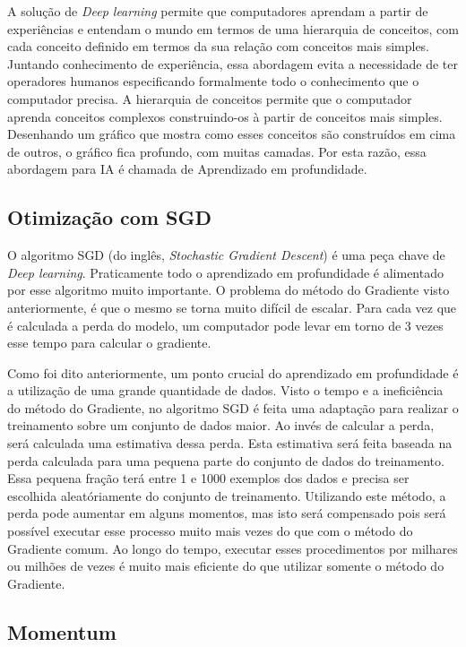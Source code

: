 A solução de \textit{Deep learning} permite que computadores aprendam
a partir de experiências e entendam o mundo em termos de uma
hierarquia de conceitos, com cada conceito definido em termos da sua
relação com conceitos mais simples. Juntando conhecimento de
experiência, essa abordagem evita a necessidade de ter operadores
humanos especificando formalmente todo o conhecimento que o computador
precisa. A hierarquia de conceitos permite que o computador aprenda
conceitos complexos construindo-os à partir de conceitos mais
simples. Desenhando um gráfico que mostra como esses conceitos são
construídos em cima de outros, o gráfico fica profundo, com muitas
camadas. Por esta razão, essa abordagem para IA é chamada de
Aprendizado em profundidade\cite{Goodfellow-et-al-2016-Book}.

\subsection{Otimização com SGD}

O algoritmo SGD (do inglês, \textit{Stochastic Gradient Descent}) é
uma peça chave de \textit{Deep learning}. Praticamente todo o
aprendizado em profundidade é alimentado por esse algoritmo muito
importante. O problema do método do Gradiente visto anteriormente, é
que o mesmo se torna muito difícil de escalar. Para cada vez que é
calculada a perda do modelo, um computador pode levar em torno de 3
vezes esse tempo para calcular o gradiente.

Como foi dito anteriormente, um ponto crucial do aprendizado em
profundidade é a utilização de uma grande quantidade de dados. Visto o
tempo e a ineficiência do método do Gradiente, no algoritmo SGD é
feita uma adaptação para realizar o treinamento sobre um conjunto de
dados maior. Ao invés de calcular a perda, será calculada uma
estimativa dessa perda. Esta estimativa será feita baseada na perda
calculada para uma pequena parte do conjunto de dados do
treinamento. Essa pequena fração terá entre 1 e 1000 exemplos dos
dados e precisa ser escolhida aleatóriamente do conjunto de
treinamento. Utilizando este método, a perda pode aumentar em alguns
momentos, mas isto será compensado pois será possível executar esse
processo muito mais vezes do que com o método do Gradiente
comum. Ao longo do tempo, executar esses procedimentos por milhares ou
milhões de vezes é muito mais eficiente do que utilizar somente o
método do Gradiente.

\subsection{Momentum}

